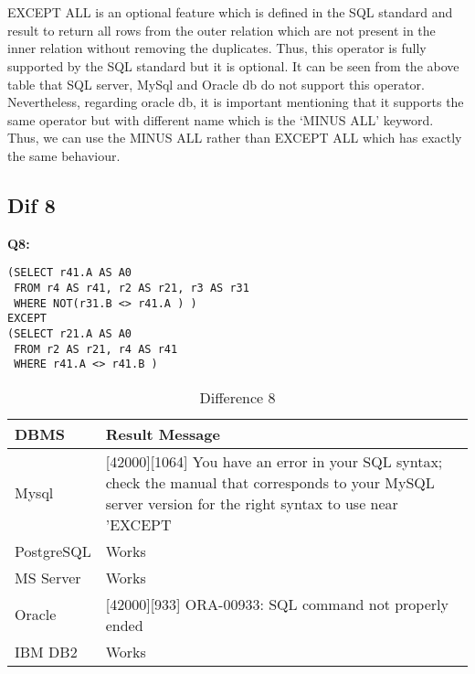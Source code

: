 \hfill\\\\
EXCEPT ALL is an optional feature which is defined in the SQL standard and result to return all rows from the outer relation which are not present in the inner relation without removing the duplicates. Thus, this operator is fully supported by the SQL standard but it is optional.  It can be seen from the above table that SQL server, MySql and Oracle db do not support this operator. Nevertheless, regarding oracle db, it is important mentioning that it supports the same operator but with different name which is the ‘MINUS ALL’ keyword. Thus, we can use the MINUS ALL rather than EXCEPT ALL which has exactly the same behaviour.   

\subsection{Dif 8}
  
\textbf{Q8:}
\begin{mdframed}[backgroundcolor=lightgray!20]
\begin{lstlisting}[style=SQL]
(SELECT r41.A AS A0
 FROM r4 AS r41, r2 AS r21, r3 AS r31
 WHERE NOT(r31.B <> r41.A ) )
EXCEPT
(SELECT r21.A AS A0
 FROM r2 AS r21, r4 AS r41
 WHERE r41.A <> r41.B )
\end{lstlisting}
\end{mdframed}


\begin{table}[h]
\centering
\caption{Difference 8}
\label{my-label}
\begin{tabular}{|p{2cm}|p{11.5cm}|}
\hline
\textbf{DBMS} & \textbf{Result Message}                                                                                                                                             \\ \hline
Mysql         & {[}42000{]}{[}1064{]} You have an error in your SQL syntax; check the manual that corresponds to your MySQL server version for the right syntax to use near 'EXCEPT \\ \hline
PostgreSQL    & Works                                                                                                                                                               \\ \hline
MS Server     & Works                                                                                                                                                               \\ \hline
Oracle        & {[}42000{]}{[}933{]} ORA-00933: SQL command not properly ended                                                                                                      \\ \hline
IBM DB2       & Works                                                                                                                                                               \\ \hline
\end{tabular}
\end{table}

